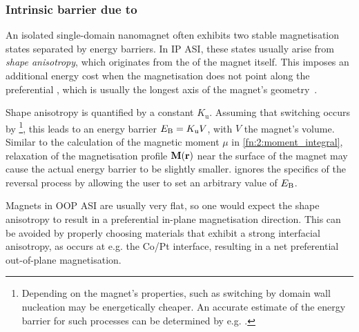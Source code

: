\subsubsection{Intrinsic barrier due to } %
\label{sec:2:shape_anisotropy}
An isolated single-domain nanomagnet often exhibits two stable magnetisation states separated by energy barriers.
In IP ASI, these states usually arise from \textit{shape anisotropy}, which originates from the  of the magnet itself.
This imposes an additional energy cost when the magnetisation does not point along the preferential , which is usually the longest axis of the magnet's geometry~\cite{PhD_Leliaert}. \par
Shape anisotropy is quantified by a  constant $K_\mathrm{u}$.
Assuming that switching occurs by \footnote{
	Depending on the magnet's properties,  such as switching by domain wall nucleation may be energetically cheaper.
	An accurate estimate of the energy barrier for such processes can be determined by e.g. .
}, this leads to an energy barrier $E_\mathrm{B} = K_\mathrm{u} V$, with $V$ the magnet's volume.
Similar to the calculation of the magnetic moment $\mu$ in \cref{fn:2:moment_integral}, relaxation of the magnetisation profile $\boldsymbol{\mathbf{M}}(\boldsymbol{\mathbf{r}})$ near the surface of the magnet may cause the actual energy barrier to be slightly smaller.
\hotspice ignores the specifics of the reversal process by allowing the user to set an arbitrary value of $E_\mathrm{B}$. \par
Magnets in OOP ASI are usually very flat, so one would expect the shape anisotropy to result in a preferential in-plane magnetisation direction.
This can be avoided by properly choosing materials that exhibit a strong interfacial anisotropy, as occurs at e.g. the Co/Pt interface, resulting in a net preferential out-of-plane magnetisation.


